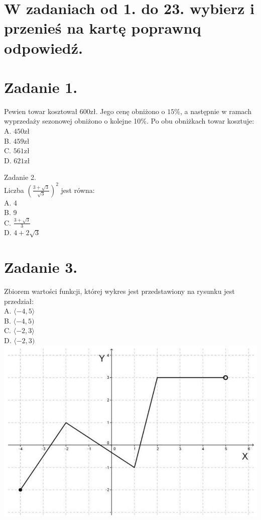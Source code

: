 \documentclass[10pt]{article}
\begin{document}
\section*{W zadaniach od 1. do 23. wybierz i przenieś na kartę poprawnq odpowiedź.}
\section*{Zadanie 1.}
Pewien towar kosztował \(600 \mathrm{zł}\). Jego cenę obniżono o \(15 \%\), a następnie w ramach wyprzedaży sezonowej obniżono o kolejne 10\%. Po obu obniżkach towar kosztuje:\\
A. \(450 \mathrm{zł}\)\\
B. \(459 \mathrm{zł}\)\\
C. \(561 \mathrm{zł}\)\\
D. \(621 \mathrm{zł}\)

Zadanie 2.\\
Liczba \(\left(\frac{3+\sqrt{3}}{\sqrt{3}}\right)^{2}\) jest równa:\\
A. 4\\
B. 9\\
C. \(\frac{3+\sqrt{3}}{3}\)\\
D. \(4+2 \sqrt{3}\)

\section*{Zadanie 3.}
Zbiorem wartości funkcji, której wykres jest przedstawiony na rysunku jest przedział:\\
A. \(\langle-4,5\rangle\)\\
B. \(\langle-4,5)\)\\
C. \(\langle-2,3\rangle\)\\
D. \(\langle-2,3)\)\\
\includegraphics[max width=\textwidth, center]{2024_11_21_94f02db55673a8a7b820g-02}
\end{document}
